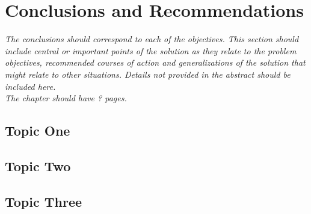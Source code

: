 \chapter{Conclusions and Recommendations}
\label{cha:Conclusions}      %

\emph{The conclusions should correspond to each of the objectives. 
This section should include central or important points of the solution as they relate to the problem objectives, recommended courses of action and generalizations of the solution that might relate to other situations. 
Details not provided in the abstract should be included here.\\
The chapter should have ? pages.
}
\section{Topic One}
\lipsum[1]
\section{Topic Two}
\lipsum[2]
\section{Topic Three}
\lipsum[3]
